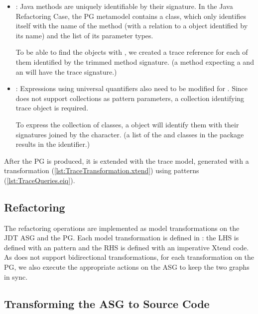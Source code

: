 \documentclass[submission,copyright,creativecommons]{eptcs}
\begin{document}
\begin{itemize}[noitemsep]
\item {}: Java methods are uniquely identifiable by their signature. In the Java Refactoring Case, the PG metamodel contains a  class, which only identifies itself with the name of the method (with a relation to a  object identified by its name) and the list of its parameter types.

To be able to find the  objects with \eiq, we created a trace reference for each of them identified by the trimmed method signature. (\Eg a method  expecting a  and an  will have the  trace signature.)
\item {}: Expressions using universal quantifiers also need to be modified for \eiq. Since \eiq does not support collections as pattern parameters, a collection identifying trace object is required. 

To express the collection of classes, a  object will identify them with their signatures joined by the \ttctt{\#} character. (\Eg a list of the  and  classes in the  package results in the  identifier.)
\end{itemize}

After the PG is produced, it is extended with the trace model, generated with a \viatra transformation (\autoref{lst:TraceTransformation.xtend}) using \eiq patterns (\autoref{lst:TraceQueries.eiq}).

\subsection[Refactoring]{Refactoring\qquad{}}

The refactoring operations are implemented as model transformations on the JDT ASG and the PG. Each model transformation is defined in \viatra: the LHS is defined with an \eiq pattern and the RHS is defined with an imperative Xtend code. As \viatra does not support bidirectional transformations, for each transformation on the PG, we also execute the appropriate actions on the ASG to keep the two graphs in sync.

\subsection{Transforming the ASG to Source Code}
\end{document}
